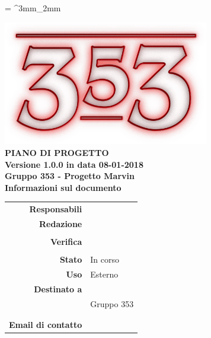\documentclass[openany, a4paper, 12pt]{report}
\begin{document}
\tabulinesep = ^3mm_2mm

\begin{titlepage}
	\centering
	\vfill
	{
		\bfseries
		\vskip2cm
		\includegraphics[width=9cm]{../../common/images/logo.png} \\
		\vfill
		\Huge{PIANO DI PROGETTO}\\
		\vfill
		\Large Versione 1.0.0 in data 08-01-2018\\
		\large Gruppo 353 - Progetto Marvin\\
		\vfill
		\normalsize Informazioni sul documento\\
		\begin{table}[htbp]
			\centering
			\renewcommand\arraystretch{1.2}
			\begin{tabular}{r|l}
				\hline
				\textbf{Responsabili}	& \Elena \\
				
				\textbf{Redazione} 		& \Riccardo \\
										& \Valentina \\
										
				\textbf{Verifica} 		& \Parwinder \\
										& \Davide \\	
				
				\textbf{Stato} 			& In corso\\
				\textbf{Uso}			& Esterno\\
				\textbf{Destinato a}   	& \Proponente\\
										& Gruppo 353\\
										& \Vardanega\\
										& \Cardin\\
				
				\textbf{Email di contatto}	& \mailgroup
			\end{tabular}
		\end{table}
		\vfill
	}    
\end{titlepage}

\tableofcontents
\listoffigures
\listoftables
\newpage
{}






 
\end{document}
